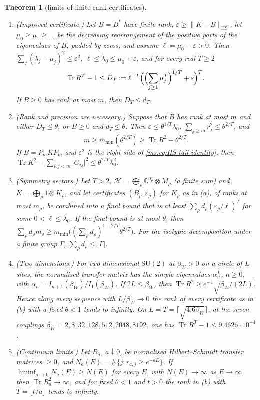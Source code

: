 \documentclass[11pt,a4paper]{amsart}
\newtheorem{theorem}{Theorem}[section]
\theoremstyle{definition}
\theoremstyle{remark}
\numberwithin{equation}{section}
\DeclareMathOperator{\Tr}{Tr}        %
\newcommand{\C}{\mathbb{C}}          %
\newcommand{\norm}[1]{\lVert #1\rVert}     %
\newcommand{\abs}[1]{\lvert #1\rvert}      %
\newcommand{\SU}{\mathrm{SU}}              %
\newcommand{\betaW}{\beta_{W}}             %
\begin{document}
\begin{theorem}[limits of finite-rank certificates]\label{thm:finite-rank-obstruction}
\begin{enumerate}[label=\textup{(\alph*)},leftmargin=*]
\item \textup{(Improved certificate.)} Let $B=B^*$ have finite rank, $\varepsilon\ge\norm{K-B}_{\mathrm{HS}}$, let $\mu_0\ge\mu_1\ge\dots$ be the decreasing rearrangement of the positive parts of the eigenvalues of $B$, padded by zeros, and assume $\ell=\mu_0-\varepsilon>0$. Then $\sum_j(\lambda_j-\mu_j)^2\le\varepsilon^2$, $\ell\le\lambda_0\le\mu_0+\varepsilon$, and for every real $T\ge2$
\[
\Tr R^T-1\le D_T:=\ell^{-T}\Bigl(\Bigl(\sum_{j\ge1}\mu_j^T\Bigr)^{1/T}+\varepsilon\Bigr)^T .
\]
If $B\ge0$ has rank at most $m$, then $D_T\le d_T$.
\item \textup{(Rank and precision are necessary.)} Suppose that $B$ has rank at most $m$ and either $D_T\le\theta$, or $B\ge0$ and $d_T\le\theta$. Then $\varepsilon\le\theta^{1/T}\lambda_0$, $\sum_{j\ge m}r_j^2\le\theta^{2/T}$, and
\[
m\ge m_{\min}(\theta^{2/T})\ge\Tr R^2-\theta^{2/T}.
\]
If $B=P_mKP_m$ and $\varepsilon^2$ is the right side of \eqref{ms:eq:HS-tail-identity}, then $\Tr K^2-\sum_{i,j<m}\abs{G_{ij}}^2\le\theta^{2/T}\lambda_0^2$.
\item \textup{(Symmetry sectors.)} Let $T>2$, $\mathcal H=\bigoplus_\rho\C^{d_\rho}\otimes M_\rho$ (a finite sum) and $K=\bigoplus_\rho1\otimes K_\rho$, and let certificates $(B_\rho,\varepsilon_\rho)$ for $K_\rho$ as in \textup{(a)}, of ranks at most $m_\rho$, be combined into a final bound that is at least $\sum_\rho d_\rho(\varepsilon_\rho/\ell)^T$ for some $0<\ell\le\lambda_0$. If the final bound is at most $\theta$, then $\sum_\rho d_\rho m_\rho\ge m_{\min}\bigl((\sum_\rho d_\rho)^{1-2/T}\theta^{2/T}\bigr)$. For the isotypic decomposition under a finite group $\Gamma$, $\sum_\rho d_\rho\le\abs\Gamma$.
\item \textup{(Two dimensions.)} For two-dimensional $\SU(2)$ at $\betaW>0$ on a circle of $L$ sites, the normalised transfer matrix has the simple eigenvalues $\alpha_n^L$, $n\ge0$, with $\alpha_n=I_{n+1}(\betaW)/I_1(\betaW)$. If $2L\le\betaW$, then $\Tr R^2\ge e^{-4}\sqrt{\betaW/(2L)}$. Hence along every sequence with $L/\betaW\to0$ the rank of every certificate as in \textup{(b)} with a fixed $\theta<1$ tends to infinity. On $L=T=\lceil\sqrt{4.6\betaW}\rceil$, at the seven couplings $\betaW=2,8,32,128,512,2048,8192$, one has $\Tr R^T-1\le9.4626\cdot10^{-4}$.
\item \textup{(Continuum limits.)} Let $R_a$, $a\downarrow0$, be normalised Hilbert--Schmidt transfer matrices $\ge0$, and $N_a(E)=\#\{j:r_{a,j}\ge e^{-aE}\}$. If $\liminf_{a\to0}N_a(E)\ge N(E)$ for every $E$, with $N(E)\to\infty$ as $E\to\infty$, then $\Tr R_a^2\to\infty$, and for fixed $\theta<1$ and $t>0$ the rank in \textup{(b)} with $T=\lfloor t/a\rfloor$ tends to infinity.

\end{enumerate}
\end{theorem}
\end{document}
